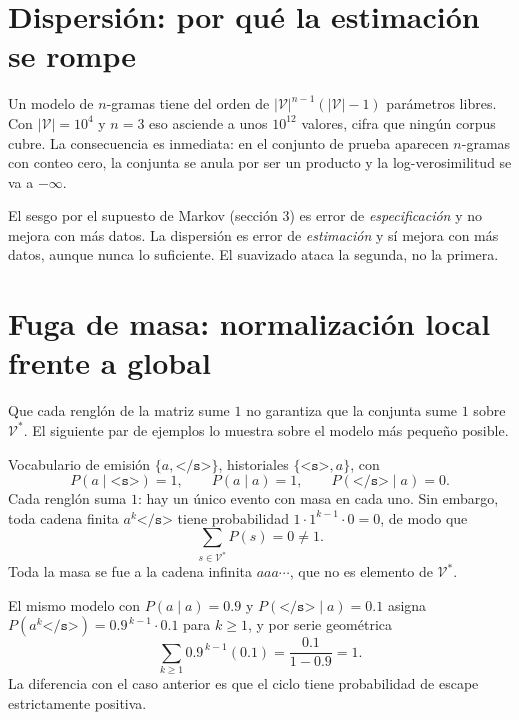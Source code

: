 \documentclass[11pt,letterpaper]{article}
\newcommand{\Vocab}{\mathcal{V}}
\newcommand{\bos}{\texttt{<s>}}
\newcommand{\eos}{\texttt{</s>}}
\begin{document}
\section{Dispersión: por qué la estimación se rompe}\label{sec:dispersion}

Un modelo de $n$-gramas tiene del orden de $|\Vocab|^{n-1}(|\Vocab|-1)$
parámetros libres. Con $|\Vocab|=10^4$ y $n=3$ eso asciende a unos $10^{12}$
valores, cifra que ningún corpus cubre. La consecuencia es inmediata: en el
conjunto de prueba aparecen $n$-gramas con conteo cero, la conjunta se anula por
ser un producto y la log-verosimilitud se va a $-\infty$.

\begin{idea}[title={Dos limitaciones distintas que conviene no mezclar}]
El sesgo por el supuesto de Markov (sección 3) es error de \emph{especificación}
y no mejora con más datos. La dispersión es error de \emph{estimación} y sí
mejora con más datos, aunque nunca lo suficiente. El suavizado ataca la segunda,
no la primera.
\end{idea}

\section{Fuga de masa: normalización local frente a global}\label{sec:fuga}

Que cada renglón de la matriz sume $1$ no garantiza que la conjunta sume $1$
sobre $\Vocab^*$. El siguiente par de ejemplos lo muestra sobre el modelo más
pequeño posible.

\begin{ejemplo}
Vocabulario de emisión $\{a,\eos\}$, historiales $\{\bos, a\}$, con
\[
P(a\mid\bos)=1,\qquad P(a\mid a)=1,\qquad P(\eos\mid a)=0 .
\]
Cada renglón suma $1$: hay un único evento con masa en cada uno. Sin embargo,
toda cadena finita $a^k\eos$ tiene probabilidad $1\cdot 1^{k-1}\cdot 0 = 0$, de
modo que
\[
\sum_{s\in\Vocab^*} P(s) = 0 \neq 1 .
\]
Toda la masa se fue a la cadena infinita $aaa\cdots$, que no es elemento de
$\Vocab^*$.
\end{ejemplo}

\begin{ejemplo}
El mismo modelo con $P(a\mid a)=0.9$ y $P(\eos\mid a)=0.1$ asigna
$P(a^k\eos)=0.9^{\,k-1}\cdot 0.1$ para $k\ge1$, y por serie geométrica
\[
\sum_{k\ge1} 0.9^{\,k-1}(0.1) = \frac{0.1}{1-0.9} = 1 .
\]
La diferencia con el caso anterior es que el ciclo tiene probabilidad de escape
estrictamente positiva.
\end{ejemplo}
\end{document}
